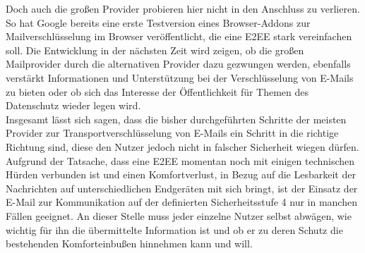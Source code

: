 \documentclass  [paper=a4,
				fontsize=12pt,
				listof=totoc,
				bibliography=totoc
				]{scrreprt}
\begin{document}
		Doch auch die großen Provider probieren hier nicht in den Anschluss zu verlieren.
		So hat Google bereits eine erste Testversion eines Browser-Addons zur Mailverschlüsselung im Browser veröffentlicht, die eine \ac{E2EE} stark vereinfachen soll.		
		Die Entwicklung in der nächsten Zeit wird zeigen, ob die großen Mailprovider durch die alternativen Provider dazu gezwungen werden, ebenfalls verstärkt Informationen und Unterstützung bei der Verschlüsselung von E-Mails zu bieten oder ob sich das Interesse der Öffentlichkeit für Themen des Datenschutz wieder legen wird.\medskip\\
		
		Insgesamt lässt sich sagen, dass die bisher durchgeführten Schritte der meisten Provider zur Transportverschlüsselung von E-Mails ein Schritt in die richtige Richtung sind, diese den Nutzer jedoch nicht in falscher Sicherheit wiegen dürfen.
		Aufgrund der Tatsache, dass eine \ac{E2EE} momentan noch mit einigen technischen Hürden verbunden ist und einen Komfortverlust, in Bezug auf die Lesbarkeit der Nachrichten auf unterschiedlichen Endgeräten mit sich bringt, ist der Einsatz der E-Mail zur Kommunikation auf der definierten Sicherheitsstufe 4 nur in manchen Fällen geeignet.
		An dieser Stelle muss jeder einzelne Nutzer selbst abwägen, wie wichtig für ihn die übermittelte Information ist und ob er zu deren Schutz die bestehenden Komforteinbußen hinnehmen kann und will.
		
%		
%				
%				
%				
%				
%									
\end{document}
